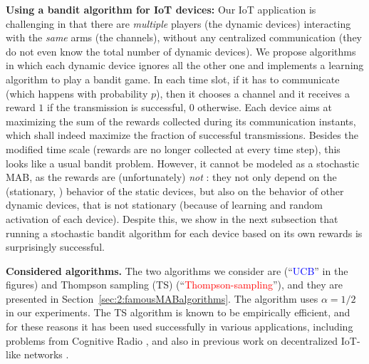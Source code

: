 \textbf{Using a bandit algorithm for IoT devices:}
%
Our IoT application is challenging in that there are \emph{multiple} players (the dynamic devices) interacting with the \emph{same} arms (the channels), without any centralized communication (they do not even know the total number of dynamic devices).
%
We propose algorithms in which each dynamic device ignores all the other one and
implements a learning algorithm to play a bandit game.
%
In each time slot, if it has to communicate (which happens with probability $p$), then it chooses a channel and it receives a reward $1$ if the transmission is successful, $0$ otherwise.
Each device aims at maximizing the sum of the rewards collected during its communication instants, which shall indeed maximize the fraction of successful transmissions. Besides the modified time scale (rewards are no longer collected at every time step), this looks like a usual bandit problem.
However, it cannot be modeled as a stochastic MAB, as the rewards are (unfortunately) \emph{not} \iid: they not only depend on the (stationary, \iid) behavior of the static devices, but also on the behavior of other dynamic devices, that is not stationary (because of learning and random activation of each device).
%
Despite this, we show in the next subsection that running a stochastic bandit algorithm for each device based on its own rewards is surprisingly successful.


\textbf{Considered algorithms.}
%
%
The two algorithms we consider are \UCB{} (``\textcolor{blue}{UCB}'' in the figures)
and Thompson sampling (TS) (``\textcolor{red}{Thompson-sampling}''),
and they are presented in Section~\ref{sec:2:famousMABalgorithms}.
%
The \UCB{} algorithm uses $\alpha = 1/2$ in our experiments.
The TS algorithm is known to be empirically efficient, and for these reasons it has been used successfully in various applications, including problems from Cognitive Radio \cite{Toldov16,Mitton16}, and also in previous work on decentralized IoT-like networks \cite{Darak16}.


